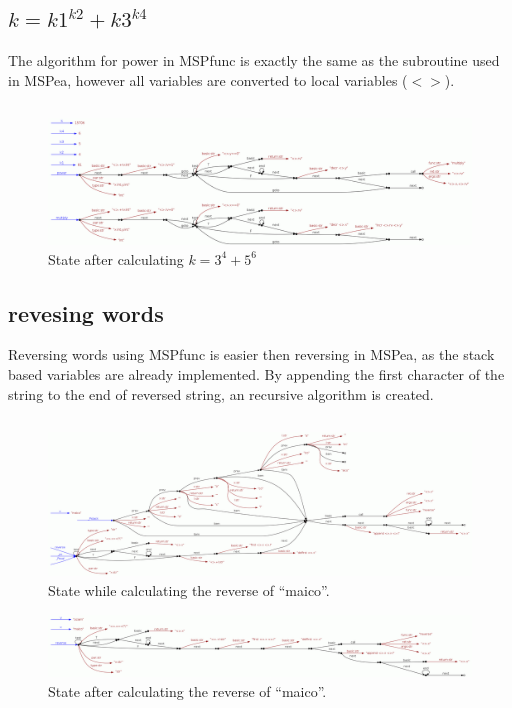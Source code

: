 \documentclass[a4paper,12px]{article}
\begin{document}
\subsection{$k = k1^{k2}+k3^{k4}$}
The algorithm for power in MSPfunc is exactly the same as the subroutine used in MSPea, however all variables are converted to local variables ($<>$).

\inputminted[bgcolor=bg]{C}{power.mspfunc}

\begin{figure}[h]
    \centering
    \includegraphics[width=\linewidth]{power_mspfunc.png}
    \caption{State after calculating $k = 3^4 + 5^6$}
\end{figure}
\FloatBarrier%

\subsection{revesing words}
Reversing words using MSPfunc is easier then reversing in MSPea, as the stack based variables are already implemented. By appending the first character of the string to the end of reversed string, an recursive algorithm is created.

\inputminted[bgcolor=bg]{C}{reverse.mspfunc}


\begin{figure}[h]
    \centering
    \includegraphics[width=0.8\linewidth]{reverse2_mspfunc.png}
    \caption{State while calculating the reverse of ``maico''.}
\end{figure}
\FloatBarrier%
\begin{figure}[h]
    \centering
    \includegraphics[width=0.8\linewidth]{reverse_mspfunc.png}
    \caption{State after calculating the reverse of ``maico''.}
\end{figure}
\FloatBarrier%




% 
% 
\end{document}
